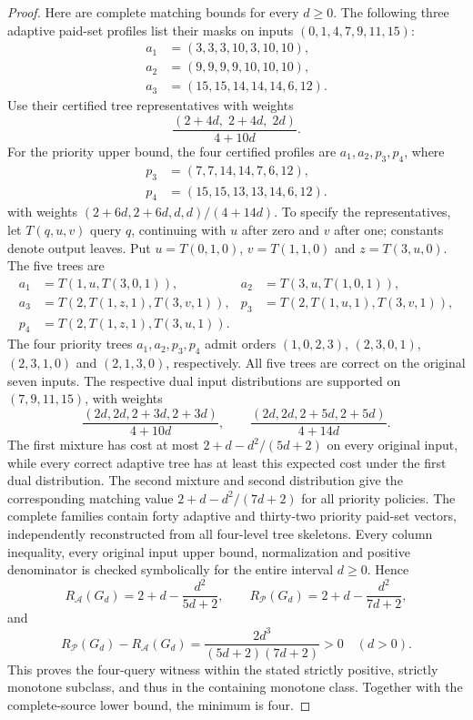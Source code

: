 \documentclass[pdflatex,sn-mathphys-num]{sn-jnl}
\theoremstyle{thmstyleone}
\theoremstyle{thmstylethree}
\theoremstyle{thmstyletwo}
\begin{document}
\begin{proof}
Here are complete matching bounds for every $d\ge0$. The following
three adaptive paid-set profiles list their masks on inputs
$(0,1,4,7,9,11,15)$:
\[
 \begin{aligned}
 a_1&=(3,3,3,10,3,10,10),\\
 a_2&=(9,9,9,9,10,10,10),\\
 a_3&=(15,15,14,14,14,6,12).
 \end{aligned}
\]
Use their certified tree representatives with weights
\[
 \frac{(2+4d,\;2+4d,\;2d)}{4+10d}.
\]
For the priority upper bound, the four certified profiles are
$a_1,a_2,p_3,p_4$, where
\[
 \begin{aligned}
 p_3&=(7,7,14,14,7,6,12),\\
 p_4&=(15,15,13,13,14,6,12).
 \end{aligned}
\]
with weights $(2+6d,2+6d,d,d)/(4+14d)$.
To specify the representatives, let $T(q,u,v)$ query $q$, continuing
with $u$ after zero and $v$ after one; constants denote output leaves.
Put $u=T(0,1,0)$, $v=T(1,1,0)$ and $z=T(3,u,0)$. The five trees are
\[
 \begin{aligned}
 a_1&=T(1,u,T(3,0,1)),&
 a_2&=T(3,u,T(1,0,1)),\\
 a_3&=T(2,T(1,z,1),T(3,v,1)),&
 p_3&=T(2,T(1,u,1),T(3,v,1)),\\
 p_4&=T(2,T(1,z,1),T(3,u,1)).
 \end{aligned}
\]
The four priority trees $a_1,a_2,p_3,p_4$ admit orders
$(1,0,2,3)$, $(2,3,0,1)$, $(2,3,1,0)$ and $(2,1,3,0)$,
respectively. All five trees are correct on the original seven inputs.
The respective dual input distributions are supported on $(7,9,11,15)$,
with weights
\[
 \frac{(2d,2d,2+3d,2+3d)}{4+10d},\qquad
 \frac{(2d,2d,2+5d,2+5d)}{4+14d}.
\]
The first mixture has cost at most
$2+d-d^2/(5d+2)$ on every original input, while every correct adaptive
tree has at least this expected cost under the first dual distribution.
The second mixture and second distribution give the corresponding
matching value $2+d-d^2/(7d+2)$ for all priority policies.
The complete families contain forty adaptive and thirty-two priority
paid-set vectors, independently reconstructed from all four-level tree
skeletons. Every column inequality, every original input upper bound,
normalization and positive denominator is checked symbolically for the
entire interval $d\ge0$. Hence
\[
 R_{\mathcal A}(G_d)=2+d-\frac{d^2}{5d+2},\qquad
 R_{\mathcal P}(G_d)=2+d-\frac{d^2}{7d+2},
\]
and
\[
 R_{\mathcal P}(G_d)-R_{\mathcal A}(G_d)
       =\frac{2d^3}{(5d+2)(7d+2)}>0\quad(d>0).
\]
This proves the four-query witness within the stated strictly positive,
strictly monotone subclass, and thus in the containing monotone class.
Together with the complete-source lower bound, the minimum is four.
\end{proof}
\end{document}
